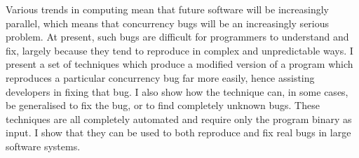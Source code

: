 Various trends in computing mean that future software will be
increasingly parallel, which means that concurrency bugs will be an
increasingly serious problem.  At present, such bugs are difficult for
programmers to understand and fix, largely because they tend to
reproduce in complex and unpredictable ways.  I present a set of
techniques which produce a modified version of a program which
reproduces a particular concurrency bug far more easily, hence
assisting developers in fixing that bug.  I also show how the
technique can, in some cases, be generalised to fix the bug, or to
find completely unknown bugs.  These techniques are all completely
automated and require only the program binary as input.  I show that
they can be used to both reproduce and fix real bugs in large software
systems.

